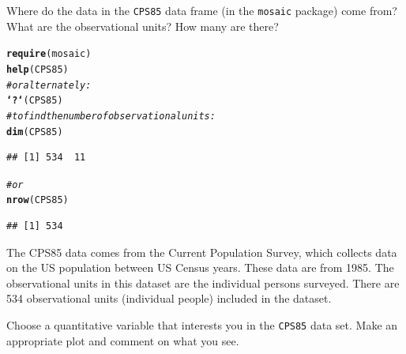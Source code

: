 \documentclass[twoside]{book}\usepackage[]{graphicx}\usepackage[]{xcolor}
\makeatletter
\newcommand{\hlcom}[1]{\textcolor[rgb]{0.678,0.584,0.686}{\textit{#1}}}%
\newcommand{\hlstd}[1]{\textcolor[rgb]{0.345,0.345,0.345}{#1}}%
\newcommand{\hlkwd}[1]{\textcolor[rgb]{0.737,0.353,0.396}{\textbf{#1}}}%
\newenvironment{kframe}{%
 \def\at@end@of@kframe{}%
 \ifinner\ifhmode%
  \def\at@end@of@kframe{\end{minipage}}%
  \begin{minipage}{\columnwidth}%
 \fi\fi%
 \def\FrameCommand##1{\hskip\@totalleftmargin \hskip-\fboxsep
 \colorbox{shadecolor}{##1}\hskip-\fboxsep
     \hskip-\linewidth \hskip-\@totalleftmargin \hskip\columnwidth}%
 \MakeFramed {\advance\hsize-\width
   \@totalleftmargin\z@ \linewidth\hsize
   \@setminipage}}%
 {\par\unskip\endMakeFramed%
 \at@end@of@kframe}
\newenvironment{knitrout}{}{} %
\newcommand{\Rindex}[1]{\index{\texttt{#1}}}
\newcommand{\dataframe}[1]{{\color{blue!80!black}\texttt{#1}}\Rindex{#1}}
\newcommand{\pkg}[1]{{\color{red!80!black}\texttt{#1}}\Rindex{#1}}
\makeatother
\begin{document}
\begin{problem}
	Where do the data in the \dataframe{CPS85} data frame (in the 
	\pkg{mosaic} package) come from?  What are the observational 
	units?  How many are there?
\end{problem}

\begin{solution}
\begin{knitrout}
\color{fgcolor}\begin{kframe}
\begin{alltt}
\hlkwd{require}\hlstd{(mosaic)}
\hlkwd{help}\hlstd{(CPS85)}
\hlcom{# or alternately:}
\hlkwd{`?`}\hlstd{(CPS85)}
\hlcom{# to find the number of observational units:}
\hlkwd{dim}\hlstd{(CPS85)}
\end{alltt}
\begin{verbatim}
## [1] 534  11
\end{verbatim}
\begin{alltt}
\hlcom{# or}
\hlkwd{nrow}\hlstd{(CPS85)}
\end{alltt}
\begin{verbatim}
## [1] 534
\end{verbatim}
\end{kframe}
\end{knitrout}
The CPS85 data comes from the Current Population Survey, which collects data on the US population between US Census years.  These data are from 1985. The observational units in this dataset are the individual persons surveyed.  There are 534 observational units (individual people) included in the dataset.
\end{solution}

\begin{problem}
	Choose a quantitative variable that interests you in the \dataframe{CPS85}
	data set.  Make an appropriate plot and comment on what you see.
\end{problem}
\end{document}
